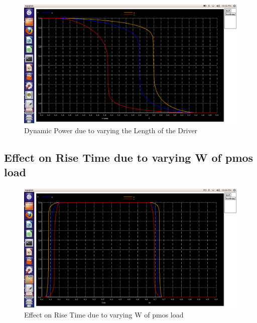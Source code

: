 \documentclass[12pt,a4paper]{article}
\begin{document}
\begin{center}
 \begin{figure}[!ht]
 \centering
 \includegraphics[scale=0.37]{lab5_4_pic4_transfer_char_varing_Wof_loadpmos.png}
 \caption[Short]{Dynamic Power due to varying the Length of the Driver}
 \end{figure}
 
\subsection{Effect on Rise Time due to varying W of pmos load} 
 \begin{figure}[!ht]
 \centering
 \includegraphics[scale=0.34]{lab5_4_pic5_effectonrisetimeduetovaringWofpmosload.png}
 \caption[Short]{Effect on Rise Time due to varying W of pmos load}
 \end{figure}
 
 

\end{center}
\end{document}
